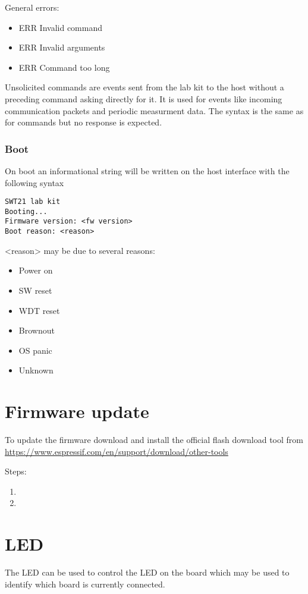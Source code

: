 \documentclass{article}[a4paper]
\begin{document}
General errors:
\begin{itemize}[noitemsep]
\item ERR Invalid command
\item ERR Invalid arguments
\item ERR Command too long
\end{itemize}

Unsolicited commands are events sent from the lab kit to the host without a
preceding command asking directly for it. It is used for events like incoming
communication packets and periodic measurment data. The syntax is the same as
for commands but no response is expected.

\subsubsection{Boot}
On boot an informational string will be written on the host interface with
the following syntax

\begin{verbatim}
SWT21 lab kit
Booting...
Firmware version: <fw version>
Boot reason: <reason>
\end{verbatim}

<reason> may be due to several reasons:
\begin{itemize}[noitemsep]
\item Power on
\item SW reset
\item WDT reset
\item Brownout
\item OS panic
\item Unknown
\end{itemize}

\section{Firmware update}
To update the firmware download and install the official flash download tool from
\url{https://www.espressif.com/en/support/download/other-tools}

Steps:
\begin{enumerate}
\item
\item
\end{enumerate}

\section{LED}
The LED can be used to control the LED on the board which may be used to
identify which board is currently connected.
\end{document}
